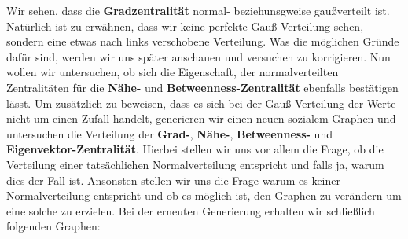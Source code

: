 Wir sehen, dass die \textbf{Gradzentralität} normal- beziehunsgweise gaußverteilt ist. Natürlich ist zu erwähnen, dass wir keine perfekte Gauß-Verteilung sehen, sondern eine etwas nach links verschobene Verteilung. Was die möglichen Gründe dafür sind, werden wir uns später anschauen und versuchen zu korrigieren. Nun wollen wir untersuchen, ob sich die Eigenschaft, der  normalverteilten Zentralitäten für die \textbf{Nähe-} und \textbf{Betweenness-Zentralität} ebenfalls bestätigen lässt. Um zusätzlich zu beweisen, dass es sich bei der Gauß-Verteilung der Werte nicht um einen Zufall handelt, generieren wir einen neuen sozialem Graphen und untersuchen die Verteilung der \textbf{Grad-}, \textbf{Nähe-}, \textbf{Betweenness-} und \textbf{Eigenvektor-Zentralität}. Hierbei stellen wir uns vor allem die Frage, ob die Verteilung einer tatsächlichen Normalverteilung entspricht und falls ja, warum dies der Fall ist. Ansonsten stellen wir uns die Frage warum es keiner Normalverteilung entspricht und ob es möglich ist, den Graphen zu verändern um eine solche zu erzielen. Bei der erneuten Generierung erhalten wir schließlich folgenden Graphen:

